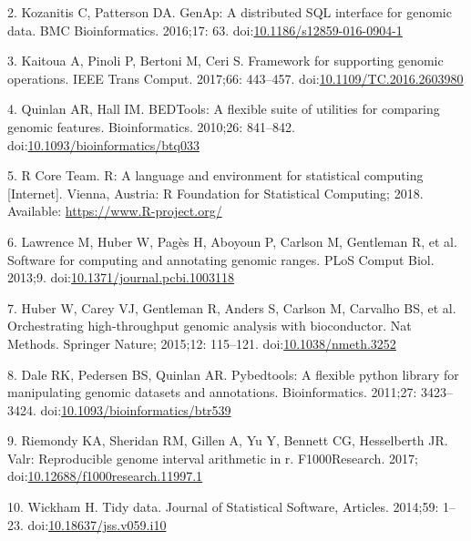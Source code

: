 \documentclass[10pt,letterpaper]{article}
\begin{document}
\hypertarget{ref-Kozanitis2016-bm}{}
2. Kozanitis C, Patterson DA. GenAp: A distributed SQL interface for
genomic data. BMC Bioinformatics. 2016;17: 63.
doi:\href{https://doi.org/10.1186/s12859-016-0904-1}{10.1186/s12859-016-0904-1}

\hypertarget{ref-Kaitoua2017-pw}{}
3. Kaitoua A, Pinoli P, Bertoni M, Ceri S. Framework for supporting
genomic operations. IEEE Trans Comput. 2017;66: 443--457.
doi:\href{https://doi.org/10.1109/TC.2016.2603980}{10.1109/TC.2016.2603980}

\hypertarget{ref-Quinlan2010-gc}{}
4. Quinlan AR, Hall IM. BEDTools: A flexible suite of utilities for
comparing genomic features. Bioinformatics. 2010;26: 841--842.
doi:\href{https://doi.org/10.1093/bioinformatics/btq033}{10.1093/bioinformatics/btq033}

\hypertarget{ref-r-core}{}
5. R Core Team. R: A language and environment for statistical computing
{[}Internet{]}. Vienna, Austria: R Foundation for Statistical Computing;
2018. Available: \url{https://www.R-project.org/}

\hypertarget{ref-Lawrence2013-wg}{}
6. Lawrence M, Huber W, Pagès H, Aboyoun P, Carlson M, Gentleman R, et
al. Software for computing and annotating genomic ranges. PLoS Comput
Biol. 2013;9.
doi:\href{https://doi.org/10.1371/journal.pcbi.1003118}{10.1371/journal.pcbi.1003118}

\hypertarget{ref-Huber2015-ei}{}
7. Huber W, Carey VJ, Gentleman R, Anders S, Carlson M, Carvalho BS, et
al. Orchestrating high-throughput genomic analysis with bioconductor.
Nat Methods. Springer Nature; 2015;12: 115--121.
doi:\href{https://doi.org/10.1038/nmeth.3252}{10.1038/nmeth.3252}

\hypertarget{ref-Dale2011-js}{}
8. Dale RK, Pedersen BS, Quinlan AR. Pybedtools: A flexible python
library for manipulating genomic datasets and annotations.
Bioinformatics. 2011;27: 3423--3424.
doi:\href{https://doi.org/10.1093/bioinformatics/btr539}{10.1093/bioinformatics/btr539}

\hypertarget{ref-Kent2017}{}
9. Riemondy KA, Sheridan RM, Gillen A, Yu Y, Bennett CG, Hesselberth JR.
Valr: Reproducible genome interval arithmetic in r. F1000Research. 2017;
doi:\href{https://doi.org/10.12688/f1000research.11997.1}{10.12688/f1000research.11997.1}

\hypertarget{ref-Wickham2014-jc}{}
10. Wickham H. Tidy data. Journal of Statistical Software, Articles.
2014;59: 1--23.
doi:\href{https://doi.org/10.18637/jss.v059.i10}{10.18637/jss.v059.i10}
\end{document}
